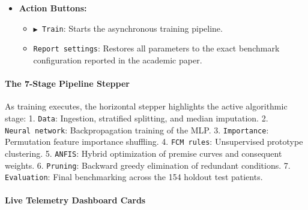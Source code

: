 \documentclass[10pt,a4paper]{article}
\providecommand{\tightlist}{\setlength{\itemsep}{1pt}\setlength{\parskip}{1pt}}
\begin{document}
\begin{itemize}
  \begin{itemize}
  \tightlist
  \item
    \texttt{Synthetic\ patients\ asked\ to\ the\ network} (0 to 4,000):
    Number of synthetic oracle neighborhood queries used to populate
    boundary regions (Default: 2,000).
  \item
    \texttt{Prune\ conditions\ and\ rules}: Enables the automated greedy
    backward pruning engine.
  \item
    \texttt{Allowed\ fidelity\ loss\ while\ pruning} (\(0\%\) to
    \(5\%\)): Maximum permitted validation fidelity drop per pruning
    step (Default: \(1\%\)).
  \item
    \texttt{Random\ seed}: Controls synthetic sampling and cluster
    initialization (Default: 42).
  \item
    \texttt{Slow\ motion}: Adds an artificial 25ms delay per epoch so
    users can visually watch the curves move live on projector screens.
  \end{itemize}
\item
  \textbf{Action Buttons:}

  \begin{itemize}
  \tightlist
  \item
    \texttt{▶\ Train}: Starts the asynchronous training pipeline.
  \item
    \texttt{Report\ settings}: Restores all parameters to the exact
    benchmark configuration reported in the academic paper.
  \end{itemize}
\end{itemize}

\paragraph{The 7-Stage Pipeline
Stepper}\label{the-7-stage-pipeline-stepper}

As training executes, the horizontal stepper highlights the active
algorithmic stage: 1. \texttt{Data}: Ingestion, stratified splitting,
and median imputation. 2. \texttt{Neural\ network}: Backpropagation
training of the MLP. 3. \texttt{Importance}: Permutation feature
importance shuffling. 4. \texttt{FCM\ rules}: Unsupervised prototype
clustering. 5. \texttt{ANFIS}: Hybrid optimization of premise curves and
consequent weights. 6. \texttt{Pruning}: Backward greedy elimination of
redundant conditions. 7. \texttt{Evaluation}: Final benchmarking across
the 154 holdout test patients.

\paragraph{Live Telemetry Dashboard
Cards}\label{live-telemetry-dashboard-cards}
\end{document}
